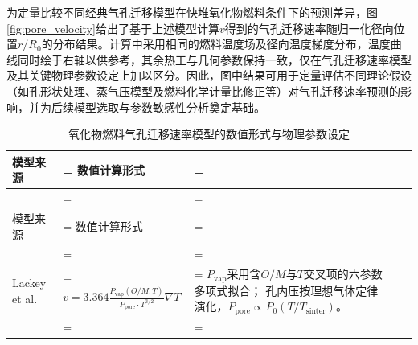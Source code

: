 为定量比较不同经典气孔迁移模型在快堆氧化物燃料条件下的预测差异，图\ref{fig:pore_velocity}给出了基于上述模型计算$v$得到的气孔迁移速率随归一化径向位置$r/R_0$的分布结果。计算中采用相同的燃料温度场及径向温度梯度分布，温度曲线同时绘于右轴以供参考，其余热工与几何参数保持一致，仅在气孔迁移速率模型及其关键物理参数设定上加以区分。因此，图中结果可用于定量评估不同理论假设（如孔形状处理、蒸气压模型及燃料化学计量比修正等）对气孔迁移速率预测的影响，并为后续模型选取与参数敏感性分析奠定基础。

\begin{xltabular}{\textwidth}{@{}
		>{\centering\arraybackslash}m{2.4cm}
		>{\hsize\linewidth=\hsize
			\centering\arraybackslash}X
		>{\hsize\linewidth=\hsize
			\RaggedRight\arraybackslash}X
		@{}}
	
	\caption{氧化物燃料气孔迁移速率模型的数值形式与物理参数设定}
	\label{tab:pore_migration_formulations} \\
	
	\toprule
	模型来源
	&
	数值计算形式
	&
	\\
	\midrule
	\endfirsthead
	
	\\
	
	\toprule
	模型来源
	&
	数值计算形式
	&
	\\
	\midrule
	\endhead
	
	\midrule
	\\
	\endfoot
	
	\bottomrule
	\endlastfoot
	
	
	Lackey et al. \cite{lackeyPorosityActinideRedistribution1972} &
	$\displaystyle v = 3.364 \frac{P_{\mathrm{vap}}(O/M, T)}
	{P_{\mathrm{pore}} \cdot T^{3/2}} \nabla T$ &
	$P_{\mathrm{vap}}$采用含$O/M$与$T$交叉项的六参数多项式拟合；\newline
	孔内压按理想气体定律演化，$P_{\mathrm{pore}}\propto P_0(T/T_{\mathrm{sinter}})$。
	\\
	\addlinespace
	

\end{xltabular}
